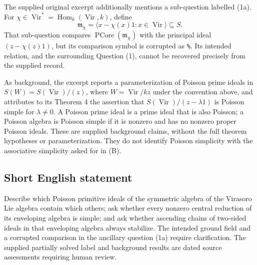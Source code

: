 \documentclass[11pt]{article}
\begin{document}
The supplied original excerpt additionally mentions a sub-question labelled (1a). For \(\chi\in\operatorname{Vir}^{*}=\operatorname{Hom}_k(\operatorname{Vir},k)\), define
\[
\mathfrak m_\chi=\langle x-\chi(x)1:x\in\operatorname{Vir}\rangle\subseteq S.
\]
That sub-question compares \(\operatorname{PCore}(\mathfrak m_\chi)\) with the principal ideal \((z-\chi(z)1)\), but its comparison symbol is corrupted as \texttt{\%}. Its intended relation, and the surrounding Question (1), cannot be recovered precisely from the supplied record.

As background, the excerpt reports a parameterization of Poisson prime ideals in \(S(W)=S(\operatorname{Vir})/(z)\), where \(W=\operatorname{Vir}/kz\) under the convention above, and attributes to its Theorem 4 the assertion that \(S(\operatorname{Vir})/(z-\lambda 1)\) is Poisson simple for \(\lambda\neq0\). A Poisson prime ideal is a prime ideal that is also Poisson; a Poisson algebra is Poisson simple if it is nonzero and has no nonzero proper Poisson ideals. These are supplied background claims, without the full theorem hypotheses or parameterization. They do not identify Poisson simplicity with the associative simplicity asked for in (B).
\subsection{Short English statement}
Describe which Poisson primitive ideals of the symmetric algebra of the Virasoro Lie algebra contain which others; ask whether every nonzero central reduction of its enveloping algebra is simple; and ask whether ascending chains of two-sided ideals in that enveloping algebra always stabilize. The intended ground field and a corrupted comparison in the ancillary question (1a) require clarification. The supplied partially solved label and background results are dated source assessments requiring human review.
\end{document}
